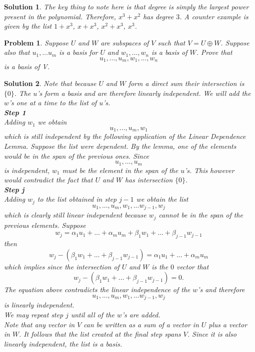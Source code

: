 \documentclass{article}
\theoremstyle{problemstyle}
\newtheorem{problem}{Problem}
\theoremstyle{problemstyle}
\newtheorem{solution}{Solution}
\begin{document}
\begin{solution}
The key thing to note here is that degree is simply the largest power present in the polynomial. Therefore, $x^3 + x^2$ has degree $3$. A counter example is given by the list $1+x^3$, $x + x^3$, $x^2+x^3$, $x^3$.   
\end{solution}

\begin{problem}
Suppose $U$ and $W$ are subspaces of $V$ such that $V = U \oplus W$. Suppose also that $u_1, ... u_m$ is a basis for $U$ and $w_1,...,w_n$ is a basis of $W$. Prove that $$u_1,...,u_m,w_1,...,w_n$$ is a basis of V. 
\end{problem}

\begin{solution}
Note that because $U$ and $W$ form a direct sum their intersection is $\{0\}$. The $u$'s form a basis and are therefore linearly independent. We will add the $w$'s one at a time to the list of $u$'s.\\ 

\textbf{Step 1}\\

Adding $w_1$ we obtain $$u_1,...,u_m,w_1$$ which is still independent by the following application of the Linear Dependence Lemma. Suppose the list were dependent. By the lemma, one of the elements would be in the span of the previous ones. Since $$u_1,...,u_m$$ is independent, $w_1$ must be the element in the span of the $u$'s. This however would contradict the fact that $U$ and $W$ has intersection $\{0\}$.\\ 

\textbf{Step j}\\

Adding $w_j$ to the list obtained in step $j-1$ we obtain the list $$u_1,...,u_m,w_1,...w_{j-1}, w_j$$ which is clearly still linear independent because $w_j$ cannot be in the span of the previous elements. Suppose $$w_j = \alpha_1 u_1 + ... + \alpha_m u_m + \beta_1 w_1 + ...+ \beta_{j-1}w_{j-1}$$ then $$w_j -( \beta_1 w_1 + ...+ \beta_{j-1}w_{j-1}) = \alpha_1 u_1 + ... + \alpha_m u_m $$ which implies since the intersection of $U$ and $W$ is the $0$ vector that $$w_j-( \beta_1 w_1 + ...+ \beta_{j-1}w_{j-1}) = 0.$$ The equation above contradicts the linear independence of the $w$'s and therefore $$u_1,...,u_m,w_1,...w_{j-1}, w_j$$ is linearly independent.\\ 

We may repeat step $j$ until all of the $w$'s are added.\\

Note that any vector in $V$ can be written as a sum of a vector in $U$ plus a vector in $W$. It follows that the list created at the final step spans $V$. Since it is also linearly independent, the list is a basis.  
\end{solution}
\end{document}
